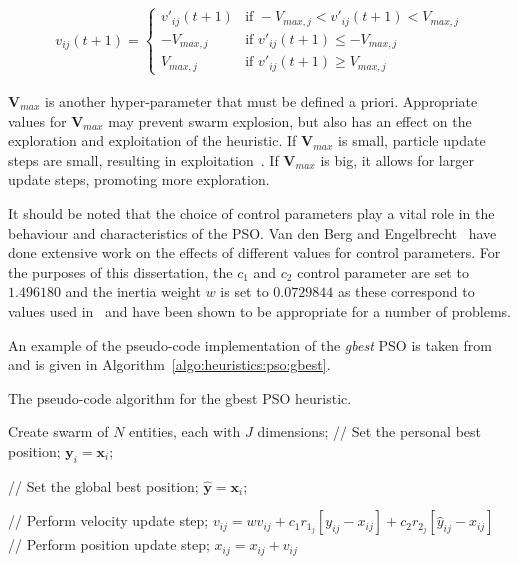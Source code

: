 \begin{equation}
	\label{eq:heuristics:pso:velocity_clamping}
	\begin{split}
		v_{ij}(t+1)=
		\begin{cases}
			v'_{ij}(t+1) & \text{if } -V_{max,j} < v'_{ij}(t+1) < V_{max,j} \\
			-V_{max,j}   & \text{if } v'_{ij}(t+1) \leq -V_{max,j}          \\
			V_{max,j}    & \text{if } v'_{ij}(t+1) \geq V_{max,j}
		\end{cases}
	\end{split}
\end{equation}

$\boldsymbol{V}_{max}$ is another hyper-parameter that must be defined a priori. Appropriate values for $\boldsymbol{V}_{max}$ may prevent swarm explosion, but also has an effect on the exploration and exploitation of the heuristic. If $\boldsymbol{V}_{max}$ is small, particle update steps are small, resulting in exploitation~\cite{ref:eberhart:1996}. If $\boldsymbol{V}_{max}$ is big, it allows for larger update steps, promoting more exploration.

It should be noted that the choice of control parameters play a vital role in the behaviour and characteristics of the \acs{PSO}. Van den Berg and Engelbrecht~\cite{ref:vandenberg:2007, ref:vandenberg:2006} have done extensive work on the effects of different values for control parameters. For the purposes of this dissertation, the $c_{1}$ and $c_{2}$ control parameter are set to $1.496180$ and the inertia weight $w$ is set to $0.0729844$ as these correspond to values used in~\cite{ref:eberhart:2000} and have been shown to be appropriate for a number of problems.

An example of the pseudo-code implementation of the \textit{gbest} \acs{PSO} is taken from~\cite{ref:engelbrecht:2007} and is given in Algorithm~\ref{algo:heuristics:pso:gbest}.

\begin{algorithm}[htb]
	\caption{The pseudo-code algorithm for the gbest \acs{PSO} heuristic.}
	\label{algo:heuristics:pso:gbest}
	\begin{algorithmic}
		\State Create swarm of $N$ entities, each with $J$ dimensions;
		\State // Set the personal best position;
		\State $\boldsymbol{y}_{i} = \boldsymbol{x}_{i}$;
		\EndIf

		\State // Set the global best position;
		\State $\boldsymbol{\hat{y}} = \boldsymbol{x}_{i}$;
		\EndIf
		\EndFor

		\State // Perform velocity update step;
		\State $v_{ij} = wv_{ij} + c_{1}r_{1_{j}}[y_{ij} - x_{ij}] + c_{2}r_{2_{j}}[\hat{y}_{ij} - x_{ij}]$
		\State // Perform position update step;
		\State $x_{ij} = x_{ij} + v_{ij}$
		\EndFor
		\EndFor
		\EndWhile
	\end{algorithmic}
\end{algorithm}

